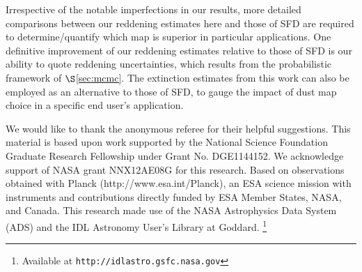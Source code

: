 \documentclass{emulateapj}
\newcommand{\PLANCK}{{\it Planck}}
\begin{document}

Irrespective of the notable imperfections in our results, more detailed
comparisons between our reddening estimates here and those of SFD are required 
to determine/quantify which map is superior in particular applications. One 
definitive improvement of our reddening estimates relative to those of SFD is 
our ability to quote reddening uncertainties, which results from the 
probabilistic framework of $\S$\ref{sec:mcmc}. The extinction estimates from 
this work can also be employed as an alternative to those of SFD, to gauge the 
impact of dust map choice in a specific end user's application.

We would like to thank the anonymous referee for their helpful suggestions. 
This material is based upon work supported by the National Science Foundation 
Graduate Research Fellowship under Grant No. DGE1144152. We acknowledge support
of NASA grant NNX12AE08G for this research. Based on observations obtained with
Planck (http://www.esa.int/Planck), an ESA science mission with instruments and
contributions directly funded by ESA Member States, NASA, and Canada. This 
research made use of the NASA Astrophysics Data System (ADS) and the IDL 
Astronomy User's Library at Goddard. \footnote{Available at 
\texttt{http://idlastro.gsfc.nasa.gov}}



\end{document}
